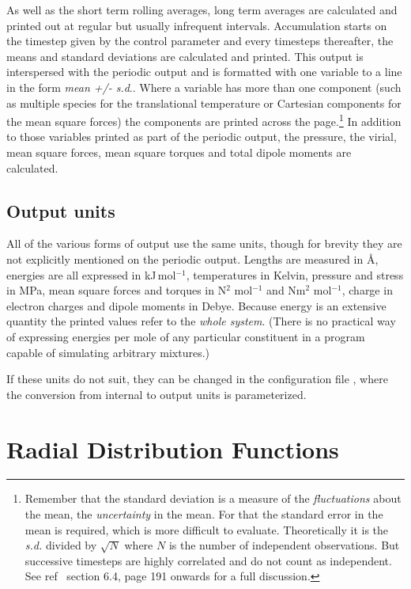 \documentclass[a4paper,twoside]{report}
\begin{document}
As well as the short term rolling averages, long term averages are
calculated and printed out at regular but usually infrequent
intervals.  Accumulation starts on the timestep given by the control
parameter  and every 
timesteps thereafter, the means and standard deviations are calculated
and printed.  This output is interspersed with the periodic output and
is formatted with one variable to a line in the form \emph{mean +/-
  s.d}.. Where a variable has more than one component (such as
multiple species for the translational temperature or Cartesian
components for the mean square forces) the components are printed
across the page.\footnote{Remember that the standard deviation is a
  measure of the \emph{fluctuations} about the mean,  the
  \emph{uncertainty} in the mean. For that the standard error in the
  mean is required, which is more difficult to evaluate.
  Theoretically it is the \emph{s.d.} divided by $\sqrt N$ where $N$
  is the number of independent observations.  But successive timesteps
  are highly correlated and do not count as independent.  See
  ref~\cite{allen:87} section 6.4, page 191 onwards for a full
  discussion.}  In addition to those variables printed as part of the
periodic output, the pressure, the virial, mean square forces, mean
square torques and total dipole moments are calculated.

\subsection{Output units}
All of the various forms of output use the same units, though for
brevity they are not explicitly mentioned on the periodic output.
Lengths are measured in {\AA}, energies are all expressed in
kJ\,mol$^{-1}$, temperatures in Kelvin, pressure and stress in MPa,
mean square forces and torques in N$^2$ mol$^{-1}$ and Nm$^2$
mol$^{-1}$, charge in electron charges and dipole moments in Debye.
Because energy is an extensive quantity the printed values refer to
the \emph{whole system}.  (There is no practical way of expressing
energies per mole of any particular constituent in a program capable
of simulating arbitrary mixtures.)

If these units do not suit, they can be changed in the configuration
file , where the conversion from internal to output units
is parameterized.
\section{Radial Distribution Functions}%
\end{document}
